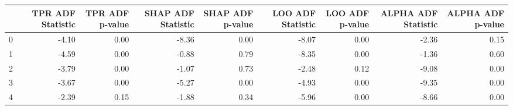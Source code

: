 \begin{tabular}{lrrrrrrrr}
\toprule
 & TPR ADF Statistic & TPR ADF p-value & SHAP ADF Statistic & SHAP ADF p-value & LOO ADF Statistic & LOO ADF p-value & ALPHA ADF Statistic & ALPHA ADF p-value \\
\midrule
0 & -4.10 & 0.00 & -8.36 & 0.00 & -8.07 & 0.00 & -2.36 & 0.15 \\
1 & -4.59 & 0.00 & -0.88 & 0.79 & -8.35 & 0.00 & -1.36 & 0.60 \\
2 & -3.79 & 0.00 & -1.07 & 0.73 & -2.48 & 0.12 & -9.08 & 0.00 \\
3 & -3.67 & 0.00 & -5.27 & 0.00 & -4.93 & 0.00 & -9.35 & 0.00 \\
4 & -2.39 & 0.15 & -1.88 & 0.34 & -5.96 & 0.00 & -8.66 & 0.00 \\
\bottomrule
\end{tabular}
